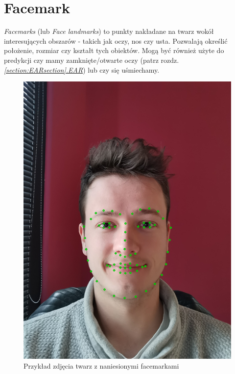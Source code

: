 \newpage

\section{Facemark} \label{section:landmarks}

\textit{Facemarks} (lub \textit{Face landmarks}) to punkty nakładane na twarz wokół interesujących obszarów - takich jak oczy, nos czy usta. Pozwalają określić położenie, rozmiar czy kształt tych obiektów. Mogą być również użyte do predykcji czy mamy zamknięte/otwarte oczy (patrz rozdz. \hyperref[section:EARsection]{\textit{\ref{section:EARsection}.EAR}}) lub czy się uśmiechamy. 

\begin{figure}[!h]
    \begin{center}
        \includegraphics[scale=0.6]{img/landmark_section/landmarks_1.png}
        \caption{Przykład zdjęcia twarz z naniesionymi facemarkami}
        \label{fig:landmarks_1}
    \end{center}
\end{figure}

